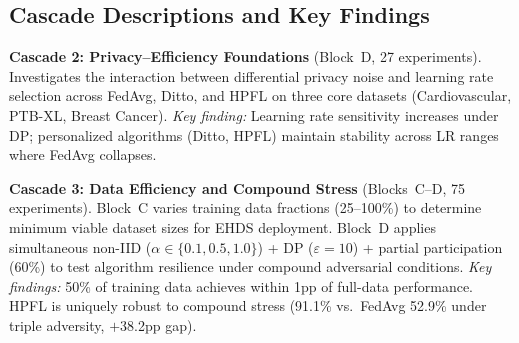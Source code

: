 \documentclass[conference]{IEEEtran}
\begin{document}
\begin{table}[htbp]
\centering
\caption{Clinical Dataset Portfolio for FL-EHDS Evaluation}
\label{tab:dataset_portfolio}
\end{table}

\subsection{Cascade Descriptions and Key Findings}

\noindent\textbf{Cascade 2: Privacy--Efficiency Foundations} (Block~D, 27 experiments). Investigates the interaction between differential privacy noise and learning rate selection across FedAvg, Ditto, and HPFL on three core datasets (Cardiovascular, PTB-XL, Breast Cancer). \textit{Key finding:} Learning rate sensitivity increases under DP; personalized algorithms (Ditto, HPFL) maintain stability across LR ranges where FedAvg collapses.

\smallskip\noindent\textbf{Cascade 3: Data Efficiency and Compound Stress} (Blocks~C--D, 75 experiments). Block~C varies training data fractions (25--100\%) to determine minimum viable dataset sizes for EHDS deployment. Block~D applies simultaneous non-IID ($\alpha \in \{0.1, 0.5, 1.0\}$) + DP ($\varepsilon{=}10$) + partial participation (60\%) to test algorithm resilience under compound adversarial conditions. \textit{Key findings:} 50\% of training data achieves within 1pp of full-data performance. HPFL is uniquely robust to compound stress (91.1\% vs.\ FedAvg 52.9\% under triple adversity, $+$38.2pp gap).
\end{document}

